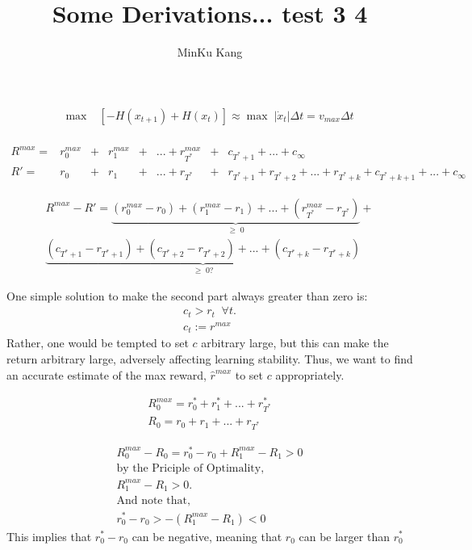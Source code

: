 \documentclass[12pt]{article}
\begin{document}
 
  
\title{Some Derivations... test  3 4}

\author{MinKu Kang}
 
\maketitle

\begin{align}
\max \; &\left[ - H(x_{t+1}) + H(x_{t}) \right] \approx 
\max \; | \dot{x}_t  | \Delta t = v_{max} \Delta t \\
\end{align}

\begin{align*}
R^{max} = &r_0^{max} &+ &r_1^{max} &+& ...  + r_{T^*}^{max} &+ &c_{T^{*}+1} + ... + c_{\infty} \\
R' = &r_0 &+ &r_1 &+& ... + r_{T^*} &+ &r_{T^{*}+1} + r_{T^{*}+2} + ... + r_{T^{*}+k} + c_{T^{*}+k+1} + ... + c_{\infty}  
\end{align*}

\begin{align*}
R^{max} - R' = \underbrace{(r_0^{max} - r_0) + (r_1^{max} - r_1) + ... + (r_{T^*}^{max} - r_{T^*})}_{\geq \; 0} + \\
\underbrace{(c_{T^{*}+1} - r_{T^{*}+1}) + (c_{T^{*}+2} - r_{T^{*}+2}) + ... + (c_{T^{*}+k} - r_{T^{*}+k})}_{\geq \; 0 ? }
\end{align*}

One simple solution to make the second part always greater than zero is:
\begin{align*}
c_t > r_t \;\; \forall t. \\
c_t := r^{max}
\end{align*}
Rather, one would be tempted to set $c$ arbitrary large, but this can make the return arbitrary large, adversely affecting learning stability. Thus, we want to find an accurate estimate of the max reward, $\hat{r}^{max}$ to set $c$ appropriately.

\begin{align*}
R_0^{max} = r_0^* + r_1^* + ... + r_{T^*}^* \\
R_0 = r_0 + r_1 + ... + r_{T^*}
\end{align*}

\begin{align*}
R_0^{max} - R_0 = r_0^* - r_0 + R_1^{max} - R_1 > 0 \\
\text{by the Priciple of Optimality,} \\
R_1^{max} - R_1 > 0. \\
\text{And note that,} \\
r_0^* - r_0 > - (R_1^{max} - R_1) < 0 
\end{align*}
This implies that $r_0^* - r_0$ can be negative, meaning that $r_0$ can be larger than $r_0^*$ 
\end{document}
